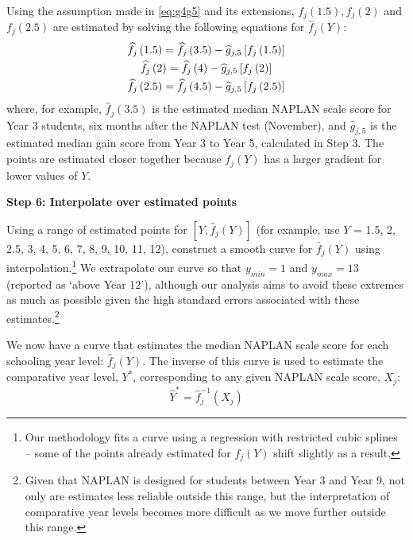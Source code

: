 Using the assumption made in \cref{eq:g4g5} and its extensions, $f_{j}(1.5),f_{j}(2)$ and $f_{j}(2.5)$ are estimated by solving the following equations for $\widehat{f}_{j}\left(Y\right)$:
\begin{equation} \begin{array}{c}
\widehat{f}_{j}\left(1.5\right) = \widehat{f}_{j}\left(3.5\right) - \widehat{g}_{j,5}\left[f_{j}\left(1.5\right)\right] \vspace{0.3em}\\
\widehat{f}_{j}\left(2\right) = \widehat{f}_{j}\left(4\right) - \widehat{g}_{j,5}\left[f_{j}\left(2\right)\right] \vspace{0.3em}\\
\widehat{f}_{j}\left(2.5\right) = \widehat{f}_{j}\left(4.5\right) - \widehat{g}_{j,5}\left[f_{j}\left(2.5\right)\right]
\end{array} \end{equation}
where, for example, $\widehat{f}_{j}(3.5)$ is the estimated median NAPLAN scale score for Year 3 students, six months after the NAPLAN test (November), and $\widehat{g}_{j,5}$ is the estimated median gain score from Year 3 to Year 5, calculated in Step 3. The points are estimated closer together because $f_{j}(Y)$ has a larger gradient for lower values of $Y$.

\textbf{Step 6: Interpolate over estimated points}
\nopagebreak

Using a range of estimated points for $\left[Y,\widehat{f}_{j}(Y)\right]$ (for example, use $Y$ = 1.5, 2, 2.5, 3, 4, 5, 6, 7, 8, 9, 10, 11, 12), construct a smooth curve for $\widehat{f}_{j}(Y)$ using interpolation.\footnote{Our methodology fits a curve using a regression with restricted cubic splines -- some of the points already estimated for $f_{j}(Y)$ shift slightly as a result.} We extrapolate our curve so that $y_{min} = 1$ and $y_{max} = 13$ (reported as `above Year 12'), although our analysis aims to avoid these extremes as much as possible given the high standard errors associated with these estimates.\footnote{Given that NAPLAN is designed for students between Year 3 and Year 9, not only are estimates less reliable outside this range, but the interpretation of comparative year levels becomes more difficult as we move further outside this range.}

We now have a curve that estimates the median NAPLAN scale score for each schooling year level: $\widehat{f}_{j}(Y)$. The inverse of this curve is used to estimate the comparative year level, $Y^{*}$, corresponding to any given NAPLAN scale score, $X_{j}$:
\begin{equation} \widehat{Y}^{*} = \widehat{f}_{j}^{-1}(X_{j}) \end{equation}

